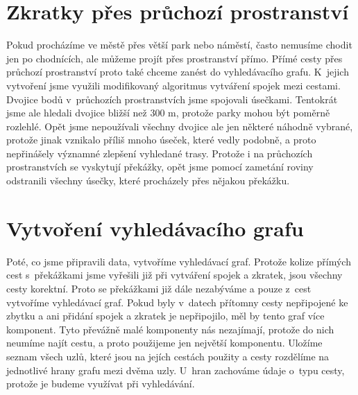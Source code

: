 \section{Zkratky přes průchozí prostranství}
Pokud procházíme ve městě přes větší park nebo náměstí, často nemusíme chodit
jen po chodnících, ale můžeme projít přes prostranství přímo. Přímé cesty přes
průchozí prostranství proto také chceme zanést do vyhledávacího grafu. K~jejich
vytvoření jsme využili modifikovaný algoritmus vytváření spojek mezi cestami.
Dvojice bodů v~průchozích prostranstvích jsme spojovali úsečkami. Tentokrát jsme
ale hledali dvojice bližší než 300 m, protože parky mohou být poměrně rozlehlé.
Opět jsme nepoužívali všechny dvojice ale jen některé náhodně vybrané, protože
jinak vznikalo příliš mnoho úseček, které vedly podobně, a proto nepřinášely
významné zlepšení vyhledané trasy. Protože i na průchozích prostranstvích se
vyskytují překážky, opět jsme pomocí zametání roviny odstranili všechny úsečky,
které procházely přes nějakou překážku.

\section{Vytvoření vyhledávacího grafu}
Poté, co jsme připravili data, vytvoříme vyhledávací graf. Protože kolize
přímých cest s~překážkami jsme vyřešili již při vytváření spojek a zkratek, jsou všechny
cesty korektní. Proto se překážkami již dále nezabýváme a pouze z~cest vytvoříme
vyhledávací graf. Pokud byly v~datech přítomny cesty nepřipojené ke zbytku a ani 
přidání spojek a zkratek je nepřipojilo, měl by tento graf více komponent. Tyto
převážně malé komponenty nás nezajímají, protože do nich neumíme najít cestu, a
proto použijeme jen největší komponentu. Uložíme seznam všech uzlů, které jsou
na jejích cestách použity a cesty rozdělíme na jednotlivé hrany grafu mezi dvěma
uzly.  U~hran zachováme údaje o~typu cesty, protože je budeme využívat při
vyhledávání.
